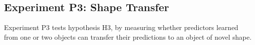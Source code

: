 
\subsection{Experiment P3:  Shape Transfer}\label{sec:Results.Shape}

Experiment P3
tests hypothesis H3, by
measuring whether predictors learned from one or two objects can
transfer their predictions to an object of novel shape.

